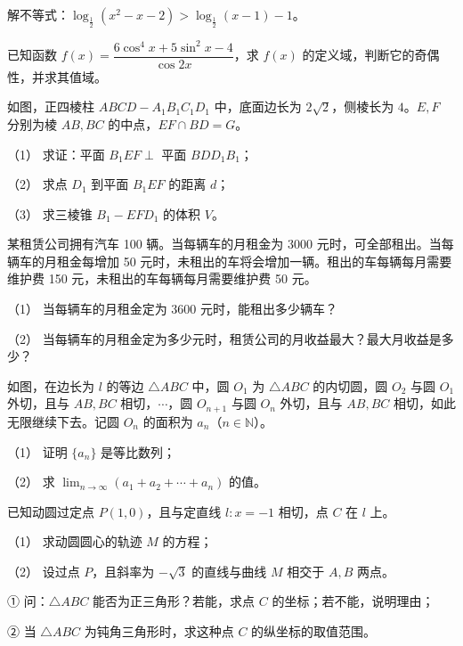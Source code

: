 \begin{question}
解不等式：$\log_{\frac12}(x^2-x-2)>\log_{\frac12}(x-1)-1$。

\end{question}
\begin{question}
已知函数 $f(x)=\dfrac{6\cos^4x+5\sin^2x-4}{\cos2x}$，求 $f(x)$ 的定义域，判断它的奇偶性，并求其值域。

\Needspace{0.4\textheight}
\end{question}
\begin{question}
如图，正四棱柱 $ABCD-A_1B_1C_1D_1$ 中，底面边长为 $2\sqrt2$，侧棱长为 $4$。$E,F$ 分别为棱 $AB,BC$ 的中点，$EF\cap BD=G$。

（1） 求证：平面 $B_1EF\perp$ 平面 $BDD_1B_1$；

（2） 求点 $D_1$ 到平面 $B_1EF$ 的距离 $d$；

（3） 求三棱锥 $B_1-EFD_1$ 的体积 $V$。
\nopagebreak[4]
\begin{center}\end{center}
\nopagebreak[4]
\end{question}
\begin{question}
某租赁公司拥有汽车 100 辆。当每辆车的月租金为 3000 元时，可全部租出。当每辆车的月租金每增加 50 元时，未租出的车将会增加一辆。租出的车每辆每月需要维护费 150 元，未租出的车每辆每月需要维护费 50 元。

（1） 当每辆车的月租金定为 3600 元时，能租出多少辆车？

（2） 当每辆车的月租金定为多少元时，租赁公司的月收益最大？最大月收益是多少？

\Needspace{0.4\textheight}
\end{question}
\begin{question}
如图，在边长为 $l$ 的等边 $\triangle ABC$ 中，圆 $O_1$ 为 $\triangle ABC$ 的内切圆，圆 $O_2$ 与圆 $O_1$ 外切，且与 $AB,BC$ 相切，$\cdots$，圆 $O_{n+1}$ 与圆 $O_n$ 外切，且与 $AB,BC$ 相切，如此无限继续下去。记圆 $O_n$ 的面积为 $a_n$（$n\in\mathbb N$）。

（1） 证明 $\{a_n\}$ 是等比数列；

（2） 求 $\lim_{n\to\infty}(a_1+a_2+\cdots+a_n)$ 的值。
\nopagebreak[4]
\begin{center}\end{center}
\nopagebreak[4]
\end{question}
\begin{question}
已知动圆过定点 $P(1,0)$，且与定直线 $l:x=-1$ 相切，点 $C$ 在 $l$ 上。

（1） 求动圆圆心的轨迹 $M$ 的方程；

（2） 设过点 $P$，且斜率为 $-\sqrt3$ 的直线与曲线 $M$ 相交于 $A,B$ 两点。

① 问：$\triangle ABC$ 能否为正三角形？若能，求点 $C$ 的坐标；若不能，说明理由；

② 当 $\triangle ABC$ 为钝角三角形时，求这种点 $C$ 的纵坐标的取值范围。

\end{question}